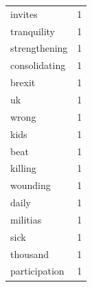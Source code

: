 \begin{tabular}{lr}
invites & 1 \\
tranquility & 1 \\
strengthening & 1 \\
consolidating & 1 \\
brexit & 1 \\
uk & 1 \\
wrong & 1 \\
kids & 1 \\
beat & 1 \\
killing & 1 \\
wounding & 1 \\
daily & 1 \\
militias & 1 \\
sick & 1 \\
thousand & 1 \\
participation & 1 \\
\bottomrule
\end{tabular}

